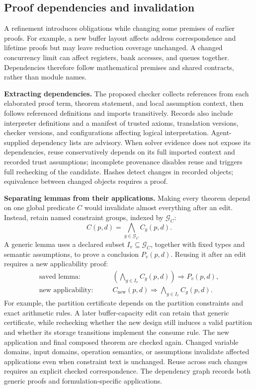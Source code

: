 \documentclass[11pt]{article}
\begin{document}
\subsection{Proof dependencies and invalidation}
A refinement introduces obligations while changing some premises of earlier proofs. For example, a new buffer layout affects address correspondence and lifetime proofs but may leave reduction coverage unchanged. A changed concurrency limit can affect registers, bank accesses, and queues together. Dependencies therefore follow mathematical premises and shared contracts, rather than module names.

\textbf{Extracting dependencies.} The proposed checker collects references from each elaborated proof term, theorem statement, and local assumption context, then follows referenced definitions and imports transitively. Records also include interpreter definitions and a manifest of trusted axioms, translation versions, checker versions, and configurations affecting logical interpretation. Agent-supplied dependency lists are advisory. When solver evidence does not expose its dependencies, reuse conservatively depends on its full imported context and recorded trust assumptions; incomplete provenance disables reuse and triggers full rechecking of the candidate. Hashes detect changes in recorded objects; equivalence between changed objects requires a proof.

\textbf{Separating lemmas from their applications.} Making every theorem depend on one global predicate $C$ would invalidate almost everything after an edit. Instead, retain named constraint groups, indexed by $\mathcal G_C$:
\begin{equation}
 C(p,d)=\bigwedge_{g\in\mathcal G_C}C_g(p,d).
\end{equation}
A generic lemma uses a declared subset $I_v\subseteq\mathcal G_C$, together with fixed types and semantic assumptions, to prove a conclusion $P_v(p,d)$. Reusing it after an edit requires a new applicability proof:
\begin{equation}
 \begin{aligned}
 \text{saved lemma:}\qquad
 &\left(\bigwedge_{g\in I_v}C_g(p,d)\right)\Longrightarrow P_v(p,d),\\
 \text{new applicability:}\qquad
 &C_{\mathrm{new}}(p,d)\Longrightarrow\bigwedge_{g\in I_v}C_g(p,d).
 \end{aligned}
 \label{eq:lemma-application}
\end{equation}
For example, the partition certificate depends on the partition constraints and exact arithmetic rules. A later buffer-capacity edit can retain that generic certificate, while rechecking whether the new design still induces a valid partition and whether its storage transitions implement the consume rule. The new application and final composed theorem are checked again. Changed variable domains, input domains, operation semantics, or assumptions invalidate affected applications even when constraint text is unchanged. Reuse across such changes requires an explicit checked correspondence. The dependency graph records both generic proofs and formulation-specific applications.
\end{document}
